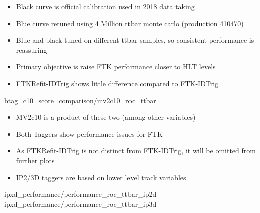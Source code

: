     { \begin{itemize}
        \item Black curve is official calibration used in 2018 data taking
        \item Blue curve retuned using 4 Million ttbar monte carlo (production 410470)
        \item Blue and black tuned on different ttbar samples, so consistent performance is reassuring
        \item Primary objective is raise FTK performance closer to HLT levels
        \item FTKRefit-IDTrig shows little difference compared to FTK-IDTrig
    \end{itemize} }
    {btag_c10_score_comparison/mv2c10_roc_ttbar}

    { \begin{itemize}
        \item MV2c10 is a product of these two (among other variables)
        \item Both Taggers show performance issues for FTK
        \item As FTKRefit-IDTrig is not distinct from FTK-IDTrig,
            it will be omitted from further plots
        \item IP2/3D taggers are based on lower level track variables 
    \end{itemize} }
    {ipxd_performance/performance_roc_ttbar_ip2d}
    {ipxd_performance/performance_roc_ttbar_ip3d}

